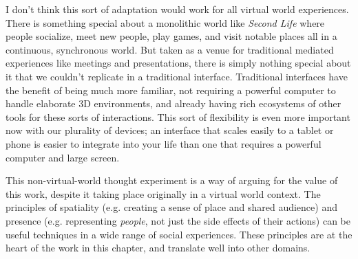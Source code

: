 I don't think this sort of adaptation would work for all virtual world experiences. There is something special about a monolithic world like \emph{Second Life} where people socialize, meet new people, play games, and visit notable places all in a continuous, synchronous world. But taken as a venue for traditional mediated experiences like meetings and presentations, there is simply nothing special about it that we couldn't replicate in a traditional interface. Traditional interfaces have the benefit of being much more familiar, not requiring a powerful computer to handle elaborate 3D environments, and already having rich ecosystems of other tools for these sorts of interactions. This sort of flexibility is even more important now with our plurality of devices; an interface that scales easily to a tablet or phone is easier to integrate into your life than one that requires a powerful computer and large screen. 

This non-virtual-world thought experiment is a way of arguing for the value of this work, despite it taking place originally in a virtual world context. The principles of spatiality (e.g. creating a sense of place and shared audience) and presence (e.g. representing \emph{people}, not just the side effects of their actions) can be useful techniques in a wide range of social experiences. These principles are at the heart of the work in this chapter, and translate well into other domains.





% 
% 
% 



